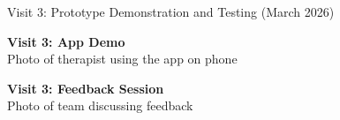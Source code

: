 \documentclass[11pt,a4paper]{article}
\begin{document}
\begin{visitbox}[visitpurple]{Visit 3: Prototype Demonstration and Testing (March 2026)}
\vspace{0.3cm}
\begin{minipage}{0.48\textwidth}
    \begin{photoplaceholder}[height=4.5cm]
        \vspace{1.2cm}
        {\small\bfseries Visit 3: App Demo}\\[0.2cm]
        {\footnotesize Photo of therapist using the app on phone}
    \end{photoplaceholder}
\end{minipage}
\hfill
\begin{minipage}{0.48\textwidth}
    \begin{photoplaceholder}[height=4.5cm]
        \vspace{1.2cm}
        {\small\bfseries Visit 3: Feedback Session}\\[0.2cm]
        {\footnotesize Photo of team discussing feedback}
    \end{photoplaceholder}
\end{minipage}

\end{visitbox}

\vspace{0.5cm}
\end{document}
